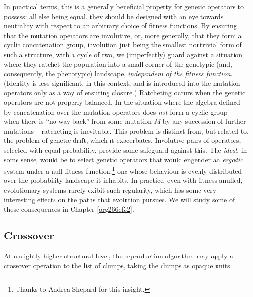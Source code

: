 \documentclass[12pt,glossary]{dalthesis}
\begin{document}
In practical terms, this is a generally beneficial property for genetic
operators to possess: all else being equal, they should be designed with
an eye towards neutrality with respect to an arbitrary choice of fitness
functions. By ensuring that the mutation operators are involutive, or, more
generally, that they form a cyclic concatenation group, involution just being
the smallest nontrivial form of such a structure, with a cycle of two, we
(imperfectly) guard against a situation where they ratchet the population into a
small corner of the genotypic (and, consequently, the phenotypic) landscape,
\emph{independent of the fitness function}. (Identity is less significant, in this
context, and is introduced into the mutation operators only
as a way of ensuring closure.) Ratcheting occurs when the genetic
operators are not properly balanced. In the situation where the algebra defined
by concatenation over the mutation operators does \emph{not} form a cyclic group --
when there is ``no way back'' from some mutation \(M\) by any succession of further
mutations -- ratcheting is inevitable. This problem is distinct from, but
related to, the problem of genetic drift, which it exacerbates. Involutive pairs
of operators, selected with equal probability, provide some safeguard against
this. The \emph{ideal}, in some sense, would be to select genetic operators that
would engender an \emph{ergodic} system under a null fitness function:\footnote{Thanks to
Andrea Shepard for this insight.} one whose behaviour is evenly distributed
over the probability landscape it inhabits. In practice, even with fitness
anulled, evolutionary systems rarely exibit such regularity, which has some very
interesting effects on the paths that evolution pursues. We will study some of
these consequences in Chapter \ref{org266ef32}.


\subsection{Crossover}
\label{sec:org748c912}
\label{orgb5721c6} 

At a slightly higher structural level, the reproduction
algorithm may apply a crossover operation to the list of clumps, taking the
clumps as opaque units.
\end{document}
